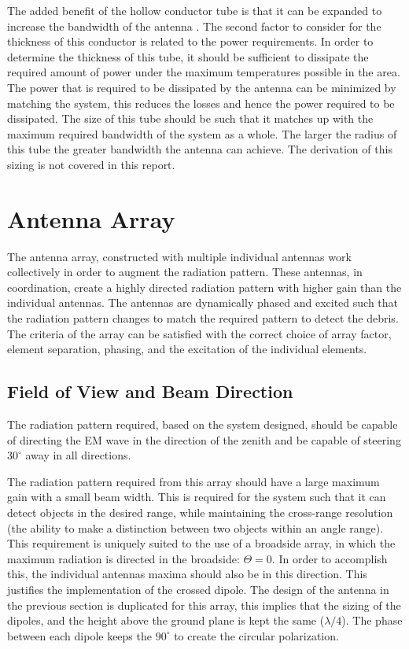 \documentclass[11pt]{witseiepaper}
\begin{document}
\begin{bibunit}[witseie]
The added benefit of the hollow conductor tube is that it can be expanded to increase the bandwidth of the antenna \cite{BroadbandAntenna}. 
The second factor to consider for the thickness of this conductor is related to the power requirements. In order to determine the thickness of this tube, it should be sufficient to dissipate the required amount of power under the maximum temperatures possible in the area. The power that is required to be dissipated by the antenna can be minimized by matching the system, this reduces the losses and hence the power required to be dissipated.
The size of this tube should be such that it matches up with the maximum required bandwidth of the system as a whole. The larger the radius of this tube the greater bandwidth the antenna can achieve. The derivation of this sizing is not covered in this report.

\section{Antenna Array} \label{sec:AntennaArray}
The antenna array, constructed with multiple individual antennas work collectively in order to augment the radiation pattern. These antennas, in coordination, create a highly directed radiation pattern with higher gain than the individual antennas. The antennas are dynamically phased and excited such that the radiation pattern changes to match the required pattern to detect the debris.
The criteria of the array can be satisfied with the correct choice of array factor, element separation, phasing, and the excitation of the individual elements.
\subsection{Field of View and Beam Direction} \label{sec:FieldofViewandBeamDirection}
The radiation pattern required, based on the system designed, should be capable of directing the EM wave in the direction of the zenith and be capable of steering $30^{\circ}$ away in all directions.

The radiation pattern required from this array should have a large maximum gain with a small beam width. This is required for the system such that it can detect objects in the desired range, while maintaining the cross-range resolution (the ability to make a distinction between two objects within an angle range).
This requirement is uniquely suited to the use of a broadside array, in which the maximum radiation is directed in the broadside: $\Theta = 0$. In order to accomplish this, the individual antennas maxima should also be in this direction. This justifies the implementation of the crossed dipole. The design of the antenna in the previous section is duplicated for this array, this implies that the sizing of the dipoles, and the height above the ground plane is kept the same ($\lambda /4$). The phase between each dipole keeps the $90^{\circ}$ to create the circular polarization.


\end{bibunit}
\end{document}
